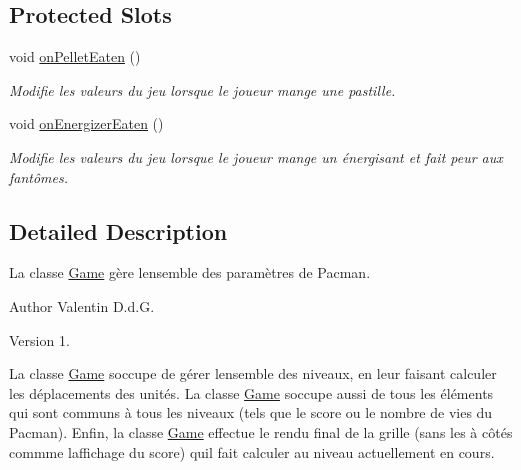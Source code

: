 \subsection*{Protected Slots}
\begin{DoxyCompactItemize}
\item 
\hypertarget{class_game_afaad4867b30abbd7005f336c9f270986}{}void \hyperlink{class_game_afaad4867b30abbd7005f336c9f270986}{on\+Pellet\+Eaten} ()\label{class_game_afaad4867b30abbd7005f336c9f270986}

\begin{DoxyCompactList}\small\item\em Modifie les valeurs du jeu lorsque le joueur mange une pastille. \end{DoxyCompactList}\item 
\hypertarget{class_game_ad3a2fed489f6bb930e3a88785ddf8c9d}{}void \hyperlink{class_game_ad3a2fed489f6bb930e3a88785ddf8c9d}{on\+Energizer\+Eaten} ()\label{class_game_ad3a2fed489f6bb930e3a88785ddf8c9d}

\begin{DoxyCompactList}\small\item\em Modifie les valeurs du jeu lorsque le joueur mange un énergisant et fait peur aux fantômes. \end{DoxyCompactList}\end{DoxyCompactItemize}


\subsection{Detailed Description}
La classe \hyperlink{class_game}{Game} gère l\textquotesingle{}ensemble des paramètres de Pacman. 

\begin{DoxyAuthor}{Author}
Valentin D.\+d.\+G. 
\end{DoxyAuthor}
\begin{DoxyVersion}{Version}
1.
\end{DoxyVersion}
La classe \hyperlink{class_game}{Game} s\textquotesingle{}occupe de gérer l\textquotesingle{}ensemble des niveaux, en leur faisant calculer les déplacements des unités. La classe \hyperlink{class_game}{Game} s\textquotesingle{}occupe aussi de tous les éléments qui sont communs à tous les niveaux (tels que le score ou le nombre de vies du Pacman). Enfin, la classe \hyperlink{class_game}{Game} effectue le rendu final de la grille (sans les à côtés commme l\textquotesingle{}affichage du score) qu\textquotesingle{}il fait calculer au niveau actuellement en cours. 

